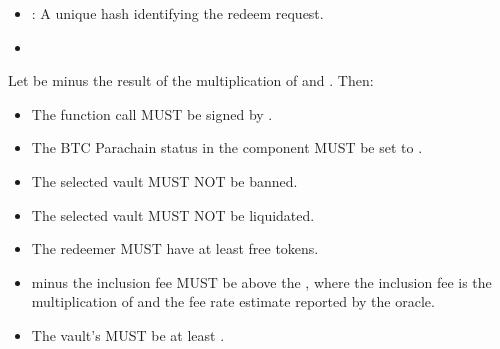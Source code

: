 \documentclass[a4paper,10pt,english]{sphinxmanual}
\begin{document}
\begin{itemize}
\item {} 
: A unique hash identifying the redeem request.

\end{itemize}

\begin{itemize}
\item {} 

\end{itemize}


Let  be  minus the result of the multiplication of {\hyperref[\detokenize{spec/fee:redeemfee}]{}} and . Then:
\begin{itemize}
\item {} 
The function call MUST be signed by .

\item {} 
The BTC Parachain status in the {\hyperref[\detokenize{spec/security:security}]{}} component MUST be set to .

\item {} 
The selected vault MUST NOT be banned.

\item {} 
The selected vault MUST NOT be liquidated.

\item {} 
The redeemer MUST have at least  free tokens.

\item {} 
 minus the inclusion fee MUST be above the {\hyperref[\detokenize{spec/redeem:redeembtcdustvalue}]{}}, where the inclusion fee is the multiplication of {\hyperref[\detokenize{spec/redeem:redeemtransactionsize}]{}} and the fee rate estimate reported by the oracle.

\item {} 
The vault’s  MUST be at least .

\end{itemize}
\end{document}
